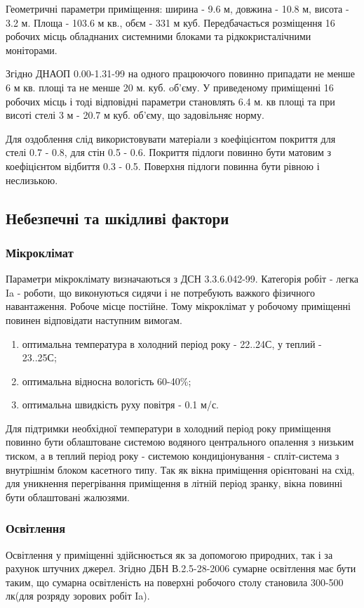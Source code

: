     Геометричні параметри приміщення: ширина - 9.6 м, довжина - 10.8 м, висота - 3.2 м. Площа - 103.6 м кв., обєм - 331 м куб.
    Передбачається розміщення 16 робочих місць обладнаних системними блоками та рідкокристалічними моніторами.

    Згідно ДНАОП 0.00-1.31-99\cite{lab-dnaop} на одного працюючого повинно припадати не менше 6 м кв. площі та не менше 20 м. куб. oб'єму.
    У приведеному приміщенні 16 робочих місць і тоді відповідні параметри становлять 6.4 м. кв площі та при висоті стелі 3 м -  20.7 м куб. об'єму,
    що задовільняє норму.

    Для оздоблення слід використовувати матеріали з коефіцієнтом покриття для стелі 0.7 - 0.8, для стін 0.5 - 0.6.
    Покриття підлоги повинно бути матовим з коефіцієнтом відбиття 0.3 - 0.5. Поверхня підлоги повинна бути рівною і неслизькою.

\subsection{Небезпечні та шкідливі фактори}
    \subsubsection{Мікроклімат}
    Параметри мікроклімату визначаються з ДСН 3.3.6.042-99\cite{lab-dsn42}. Категорія робіт - легка Ia - роботи, що виконуються сидячи і не потребують
    важкого фізичного навантаження. Робоче місце постійне. Тому мікроклімат у робочому приміщенні повинен відповідати наступним вимогам.
    \begin{enumerate}
        \item оптимальна температура в холодний період року - 22..24С, у теплий - 23..25С;
        \item оптимальна відносна вологість 60-40\%;
        \item оптимальна швидкість руху повітря - 0.1 м/с.
    \end{enumerate}

    Для підтримки необхідної температури в холодний період року приміщення повинно бути облаштоване системою водяного центрального опалення з низьким тиском,
    а в теплий період року - системою кондиціонування -  спліт-система з внутрішнім блоком касетного типу.
    Так як вікна приміщення орієнтовані на схід, для уникнення перегрівання приміщення в літній період зранку, вікна повинні бути облаштовані жалюзями.

    \subsubsection{Освітлення}
    Освітлення у приміщенні здійснюється як за допомогою природних, так і за рахунок штучних джерел.
    Згідно ДБН В.2.5-28-2006\cite{lab-dbn28} сумарне освітлення має бути таким, що сумарна освітленість на поверхні робочого столу становила 300-500 лк(для розряду зорових робіт Ia).

